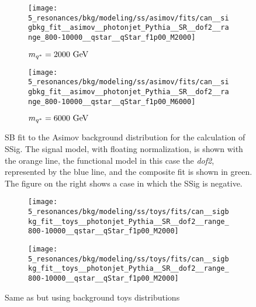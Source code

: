 \begin{figure}[ht!]
    \centering
    \begin{subfigure}[h]{0.49\linewidth}
        \centering
        \texttt{[image: 5\_resonances/bkg/modeling/ss/asimov/fits/can\_\_sigbkg\_fit\_\_asimov\_\_photonjet\_Pythia\_\_SR\_\_dof2\_\_range\_800-10000\_\_qstar\_\_qStar\_f1p00\_M2000]}
        \caption{\(m_{q^{*}} = 2000~\text{GeV}\)}
    \end{subfigure}
    \hfill
    \begin{subfigure}[h]{0.49\linewidth}
        \centering
        \texttt{[image: 5\_resonances/bkg/modeling/ss/asimov/fits/can\_\_sigbkg\_fit\_\_asimov\_\_photonjet\_Pythia\_\_SR\_\_dof2\_\_range\_800-10000\_\_qstar\_\_qStar\_f1p00\_M6000]}
        \caption{\(m_{q^{*}} = 6000~\text{GeV}\)}
    \end{subfigure}
    \caption{\ac{SB} fit to the Asimov background distribution for the calculation of \ac{SSig}. The signal model, with floating normalization, is shown with the orange line, the functional model in this case the \textit{dof2}, represented by the blue line, and the composite fit is shown in green. The figure on the right shows a case in which the \ac{SSig} is negative.}
    \label{fig:bkg:modeling:sigbkg:sstest:sstest_asimov_examples}
\end{figure}

\begin{figure}[ht!]
    \centering
    \begin{subfigure}[h]{0.49\linewidth}
        \centering
        \texttt{[image: 5\_resonances/bkg/modeling/ss/toys/fits/can\_\_sigbkg\_fit\_\_toys\_\_photonjet\_Pythia\_\_SR\_\_dof2\_\_range\_800-10000\_\_qstar\_\_qStar\_f1p00\_M2000]}
    \end{subfigure}
    \hfill
    \begin{subfigure}[h]{0.49\linewidth}
        \centering
        \texttt{[image: 5\_resonances/bkg/modeling/ss/toys/fits/can\_\_sigbkg\_fit\_\_toys\_\_photonjet\_Pythia\_\_SR\_\_dof2\_\_range\_800-10000\_\_qstar\_\_qStar\_f1p00\_M2000]}
    \end{subfigure}
    \caption{Same as \Fig{\ref{fig:bkg:modeling:sigbkg:sstest:sstest_asimov_examples}} but using background toys distributions}
    \label{fig:bkg:modeling:sigbkg:sstest:sstest_toys_examples}
\end{figure}


